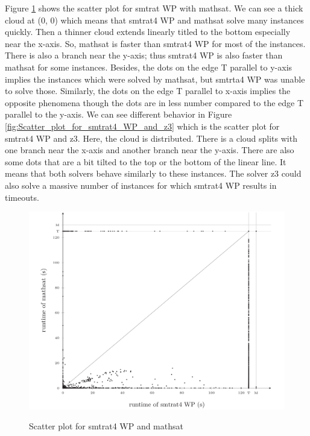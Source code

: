 \noindent Figure \ref{fig:Scatter_plot_for_smtrat4_WP_and_mathsat} shows the scatter plot for smtrat WP with mathsat.
We can see a thick cloud at (0, 0) which means that smtrat4 WP and mathsat solve many instances quickly.
Then a thinner cloud extends linearly titled to the bottom especially near the x-axis.
So, mathsat is faster than smtrat4 WP for most of the instances.
There is also a branch near the y-axis; thus smtrat4 WP is also faster than mathsat for some instances.
Besides, the dots on the edge T parallel to y-axis implies the instances which were solved by mathsat, but smtrta4 WP was unable to solve those.
Similarly, the dots on the edge T parallel to x-axis implies the opposite phenomena though the dots are in less number compared to the edge T parallel to the y-axis.
We can see different behavior in Figure \ref{fig:Scatter_plot_for_smtrat4_WP_and_z3} which is the scatter plot for smtrat4 WP and z3.
Here, the cloud is distributed.
There is a cloud splits with one branch near the x-axis and another branch near the y-axis.
There are also some dots that are a bit tilted to the top or the bottom of the linear line.
It means that both solvers behave similarly to these instances.
The solver z3 could also solve a massive number of instances for which smtrat4 WP results in timeouts.
\newline

\begin{figure}[!ht]
    \centering
    \caption{Scatter plot for smtrat4 WP and mathsat}
    \includegraphics[width=1\linewidth]{./figures/scatter-smtrat_4_preprocessing-mathsat.pdf}
  \label{fig:Scatter_plot_for_smtrat4_WP_and_mathsat}
\end{figure}

